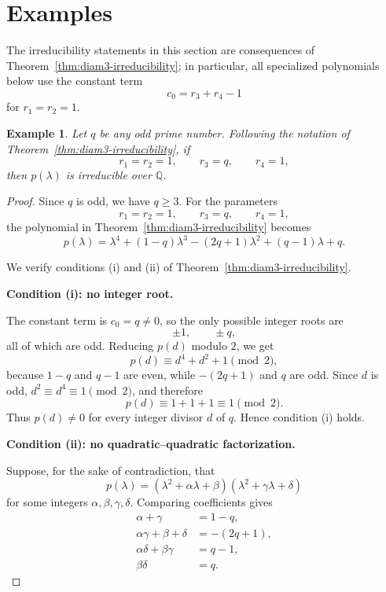 \documentclass[11pt]{amsart}
\newtheorem{exam}[thm]{\bf Example}
\begin{document}
\section{Examples}
\label{sec:examples}


The irreducibility statements in this section are consequences of Theorem~\ref{thm:diam3-irreducibility}; in particular, all specialized polynomials below use the constant term
\[
c_0=r_3+r_4-1
\]
for \(r_1=r_2=1\).

\begin{exam}\label{ExPrime}
Let \(q\) be any odd prime number. Following the notation of Theorem~\ref{thm:diam3-irreducibility}, if
\[
r_1=r_2=1,\qquad r_3=q,\qquad r_4=1,
\]
then \(p(\lambda)\) is irreducible over \(\mathbb Q\).
\end{exam}

\begin{proof}
Since \(q\) is odd, we have \(q\geq 3\). For the parameters
\[
r_1=r_2=1,\qquad r_3=q,\qquad r_4=1,
\]
the polynomial in Theorem~\ref{thm:diam3-irreducibility} becomes
\[
p(\lambda)
=
\lambda^4+(1-q)\lambda^3-(2q+1)\lambda^2+(q-1)\lambda+q.
\]

We verify conditions \textup{(i)} and \textup{(ii)} of
Theorem~\ref{thm:diam3-irreducibility}.

\medskip
\noindent\textbf{Condition \textup{(i): no integer root.}}

The constant term is \(c_0=q\neq 0\), so the only possible integer roots are
\[
\pm 1,\qquad \pm q,
\]
all of which are odd. Reducing \(p(d)\) modulo \(2\), we get
\[
p(d)\equiv d^4+d^2+1 \pmod{2},
\]
because \(1-q\) and \(q-1\) are even, while \(-(2q+1)\) and \(q\) are odd. Since \(d\) is odd, \(d^2\equiv d^4\equiv 1\pmod{2}\), and therefore
\[
p(d)\equiv 1+1+1\equiv 1\pmod{2}.
\]
Thus \(p(d)\neq 0\) for every integer divisor \(d\) of \(q\). Hence condition \textup{(i)} holds.

\medskip
\noindent\textbf{Condition \textup{(ii): no quadratic--quadratic factorization.}}

Suppose, for the sake of contradiction, that
\[
p(\lambda)
=
(\lambda^2+\alpha\lambda+\beta)
(\lambda^2+\gamma\lambda+\delta)
\]
for some integers \(\alpha,\beta,\gamma,\delta\). Comparing coefficients gives
\[
\begin{aligned}
\alpha+\gamma&=1-q,\\
\alpha\gamma+\beta+\delta&=-(2q+1),\\
\alpha\delta+\beta\gamma&=q-1,\\
\beta\delta&=q.
\end{aligned}
\]


\end{proof}
\end{document}
